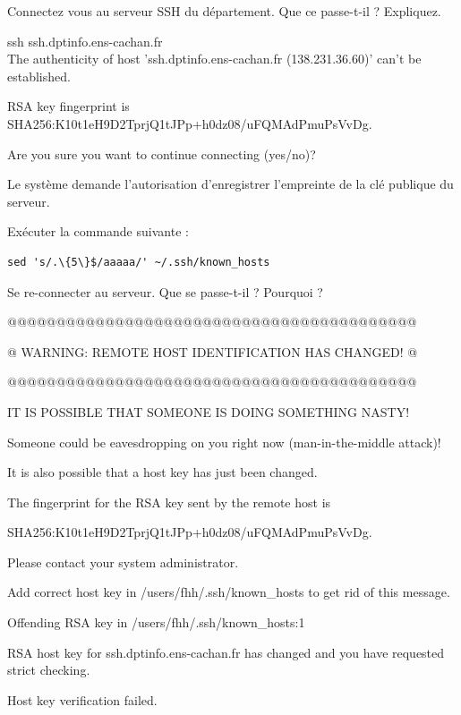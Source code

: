 \documentclass[11pt]{article}
\begin{document}
Connectez vous au serveur SSH du département. Que ce passe-t-il ? Expliquez.

\begin{solution}

ssh ssh.dptinfo.ens-cachan.fr\\

The authenticity of host 'ssh.dptinfo.ens-cachan.fr (138.231.36.60)' can't be established.

RSA key fingerprint is SHA256:K10t1eH9D2TprjQ1tJPp+h0dz08/uFQMAdPmuPsVvDg.

Are you sure you want to continue connecting (yes/no)?

Le système demande l'autorisation d'enregistrer l'empreinte de la clé publique du serveur.

\end{solution}

Exécuter la commande suivante :

\begin{verbatim}
sed 's/.\{5\}$/aaaaa/' ~/.ssh/known_hosts
\end{verbatim}

Se re-connecter au serveur. Que se passe-t-il ? Pourquoi ?

\begin{solution}

@@@@@@@@@@@@@@@@@@@@@@@@@@@@@@@@@@@@@@@@@@

@ WARNING: REMOTE HOST IDENTIFICATION HAS CHANGED! @

@@@@@@@@@@@@@@@@@@@@@@@@@@@@@@@@@@@@@@@@@@

IT IS POSSIBLE THAT SOMEONE IS DOING SOMETHING NASTY!

Someone could be eavesdropping on you right now (man-in-the-middle attack)!

It is also possible that a host key has just been changed.

The fingerprint for the RSA key sent by the remote host is

SHA256:K10t1eH9D2TprjQ1tJPp+h0dz08/uFQMAdPmuPsVvDg.

Please contact your system administrator.

Add correct host key in /users/fhh/.ssh/known\_hosts to get rid of this message.

Offending RSA key in /users/fhh/.ssh/known\_hosts:1

RSA host key for ssh.dptinfo.ens-cachan.fr has changed and you have requested strict checking.

Host key verification failed.
\end{solution}
\end{document}

